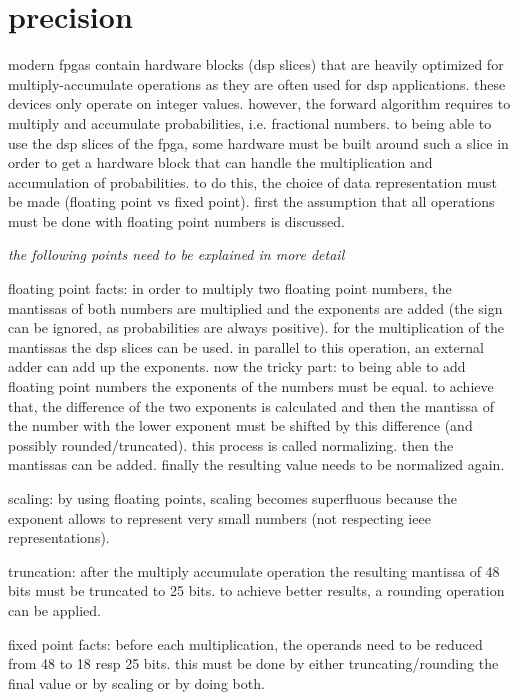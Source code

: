 \documentclass[mscthesis]{usiinfthesis}
\begin{document}
\section{precision}

modern fpgas contain hardware blocks (dsp slices) that are heavily optimized
for multiply-accumulate operations as they are often used for dsp applications.
these devices only operate on integer values. however, the forward algorithm
requires to multiply and accumulate probabilities, i.e. fractional numbers. to
being able to use the dsp slices of the fpga, some hardware must be built
around such a slice in order to get a hardware block that can handle the
multiplication and accumulation of probabilities. to do this, the choice of
data representation must be made (floating point vs fixed point). first the
assumption that all operations must be done with floating point numbers is
discussed.

\emph{\color{red}the following points need to be explained in more detail}

floating point facts:
in order to multiply two floating point numbers, the mantissas of
both numbers are multiplied and the exponents are added (the sign can be
ignored, as probabilities are always positive). for the multiplication of the
mantissas the dsp slices can be used. in parallel to this operation, an
external adder can add up the exponents. now the tricky part: to being able to
add floating point numbers the exponents of the numbers must be equal. to
achieve that, the difference of the two exponents is calculated and then the
mantissa of the number with the lower exponent must be shifted by this
difference (and possibly rounded/truncated). this process is called
normalizing. then the mantissas can be added. finally the resulting value
needs to be normalized again.

scaling: by using floating points, scaling becomes superfluous because the
exponent allows to represent very small numbers (not respecting ieee
representations).

truncation: after the multiply accumulate operation the resulting mantissa of
48 bits must be truncated to 25 bits. to achieve better results, a rounding
operation can be applied.

fixed point facts:
before each multiplication, the operands need to be reduced from 48 to 18 resp
25 bits. this must be done by either truncating/rounding the final value or by
scaling or by doing both.
\end{document}
